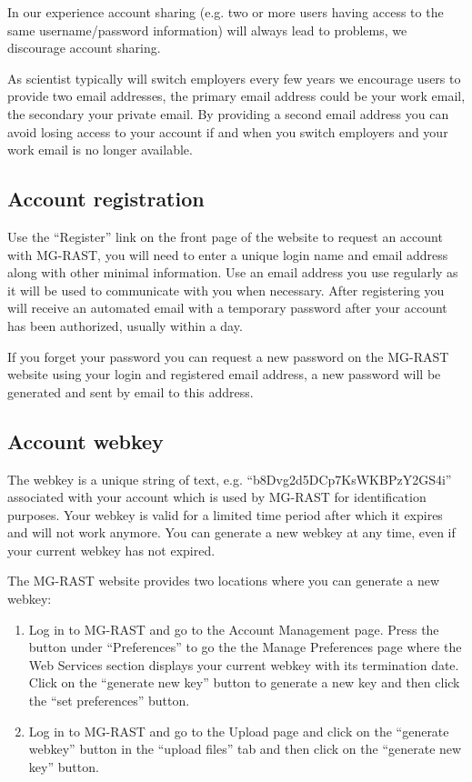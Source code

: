 \documentclass[letterpaper,10pt,english]{sphinxmanual}
\begin{document}
 In our
experience account sharing (e.g. two or more users having access to the
same username/password information) will always lead to problems, we
 discourage account sharing.

As scientist typically will switch employers every few years we
encourage users to provide two email addresses, the primary email
address could be your work email, the secondary your private email. By
providing a second email address you can avoid losing access to your
account if and when you switch employers and your work email is no
longer available.


\subsection{Account registration}
\label{\detokenize{faq:account-registration}}
Use the “Register” link on the front page of the website to request an
account with MG-RAST, you will need to enter a unique login name and
email address along with other minimal information. Use an email address
you use regularly as it will be used to communicate with you when
necessary. After registering you will receive an automated email with a
temporary password after your account has been authorized, usually
within a day.

If you forget your password you can request a new password on the
MG-RAST website using your login and registered email address, a new
password will be generated and sent by email to this address.


\subsection{Account webkey}
\label{\detokenize{faq:account-webkey}}\label{\detokenize{faq:section-webkey}}
The webkey is a unique string of text, e.g. “b8Dvg2d5DCp7KsWKBPzY2GS4i”
associated with your account which is used by MG-RAST for identification
purposes. Your webkey is valid for a limited time period after which it
expires and will not work anymore. You can generate a new webkey at any
time, even if your current webkey has not expired.

The MG-RAST website provides two locations where you can generate a new
webkey:
\begin{enumerate}
\def\theenumi{\arabic{enumi}}
\def\labelenumi{\theenumi .}
\makeatletter\def\p@enumii{\p@enumi \theenumi .}\makeatother
\item {} 
Log in to MG-RAST and go to the Account Management page. Press the
button under “Preferences” to go the the Manage Preferences page
where the Web Services section displays your current webkey with its
termination date. Click on the “generate new key” button to generate
a new key and then click the “set preferences” button.

\item {} 
Log in to MG-RAST and go to the Upload page and click on the
“generate webkey” button in the “upload files” tab and then click on
the “generate new key” button.

\end{enumerate}
\end{document}

